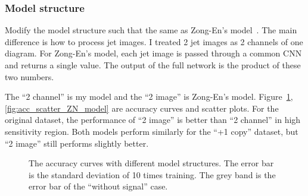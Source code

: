\documentclass[12pt]{article}
\begin{document}
        \subsubsection{Model structure}%
        \label{subs:model_structure}
            Modify the model structure such that the same as Zong-En's model~\cite{Beauchesne:2023vie}. The main difference is how to process jet images. I treated 2 jet images as 2 channels of one diagram. For Zong-En's model, each jet image is passed through a common CNN and returns a single value. The output of the full network is the product of these two numbers.

            The ``2 channel'' is my model and the ``2 image'' is Zong-En's model. Figure~\ref{fig:acc_curve_ZN_model}, \ref{fig:acc_scatter_ZN_model} are accuracy curves and scatter plots. For the original dataset, the performance of ``2 image'' is better than ``2 channel'' in high sensitivity region. Both models perform similarly for the ``+1 copy'' dataset, but ``2 image'' still performs slightly better.
            \begin{figure}[htpb]
                \centering
                \caption{The accuracy curves with different model structures. The error bar is the standard deviation of 10 times training. The grey band is the error bar of the ``without signal'' case.}
                \label{fig:acc_curve_ZN_model}
            \end{figure}
\end{document}
